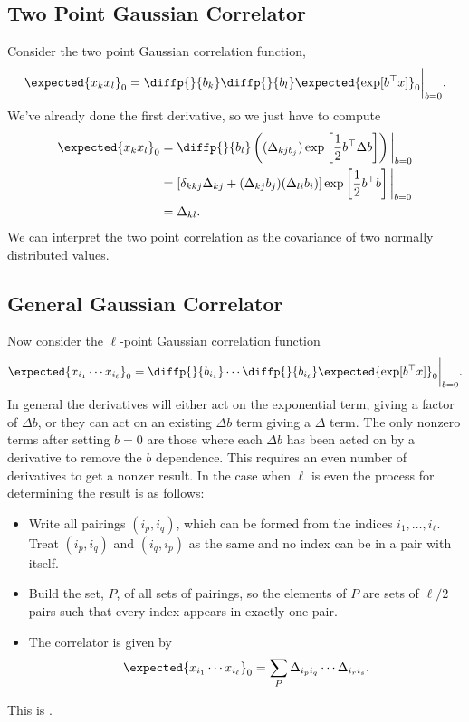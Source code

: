 \documentclass[fleqn]{NotesClass}
\newcommand{\trans}{{\top}}
\begin{document}
    \subsection{Two Point Gaussian Correlator}
    Consider the two point Gaussian correlation function,
    \begin{equation}
        \expected{x_kx_l}_{0} = \diffp{}{b_k}\diffp{}{b_l} \expected{\exp[b^\trans x]}_0 \bigg|_{b = 0}.
    \end{equation}
    We've already done the first derivative, so we just have to compute
    \begin{align}
        \expected{x_kx_l}_0 &= \diffp{}{b_l} \left( (\Delta_{kj b_j})\exp\left[ \frac{1}{2}b^\trans \Delta b \right] \right)\bigg|_{b = 0}\\
        &= [\delta_{kkj}\Delta_{kj} + (\Delta_{kj}b_j)(\Delta_{li}b_i)] \exp\left[ \frac{1}{2}b^\trans b \right]\bigg|_{b = 0}\\
        &= \Delta_{kl}.
    \end{align}
    We can interpret the two point correlation as the covariance of two normally distributed values.
    
    \subsection{General Gaussian Correlator}
    Now consider the \(\ell\)-point Gaussian correlation function
    \begin{equation}
        \expected{x_{i_1} \dotsm x_{i_\ell}}_0 = \diffp{}{b_{i_1}} \dotsm \diffp{}{b_{i_\ell}} \expected{\exp[b^\trans x]}_0 \bigg|_{b = 0}.
    \end{equation}
    In general the derivatives will either act on the exponential term, giving a factor of \(\Delta b\), or they can act on an existing \(\Delta b\) term giving a \(\Delta\) term.
    The only nonzero terms after setting \(b = 0\) are those where each \(\Delta b\) has been acted on by a derivative to remove the \(b\) dependence.
    This requires an even number of derivatives to get a nonzer result.
    In the case when \(\ell\) is even the process for determining the result is as follows:
    \begin{itemize}
        \item Write all pairings \((i_p, i_q)\), which can be formed from the indices \(i_1, \dotsc, i_\ell\).
        Treat \((i_p, i_q)\) and \((i_q, i_p)\) as the same and no index can be in a pair with itself.
        \item Build the set, \(P\), of all sets of pairings, so the elements of \(P\) are sets of \(\ell/2\) pairs such that every index appears in exactly one pair.
        \item The correlator is given by
        \begin{equation}
            \expected{x_{i_1}\dotsm x_{i_\ell}}_0 = \sum_{P} \Delta_{i_p i_q} \dotsm \Delta_{i_ri_s}.
        \end{equation}
    \end{itemize}
    This is .
    
\end{document}
